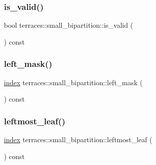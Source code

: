 \subsubsection{\texorpdfstring{is\+\_\+valid()}{is\_valid()}}
{\footnotesize\ttfamily bool terraces\+::small\+\_\+bipartition\+::is\+\_\+valid (\begin{DoxyParamCaption}{ }\end{DoxyParamCaption}) const\hspace{0.3cm}{\ttfamily [inline]}}

\mbox{\label{structterraces_1_1small__bipartition_a907f8818601439b4048d43dc4ffb8364}} 
\subsubsection{\texorpdfstring{left\+\_\+mask()}{left\_mask()}}
{\footnotesize\ttfamily \hyperlink{namespaceterraces_adbc33ccb543d1634e96d0eb02e472c77}{index} terraces\+::small\+\_\+bipartition\+::left\+\_\+mask (\begin{DoxyParamCaption}{ }\end{DoxyParamCaption}) const\hspace{0.3cm}{\ttfamily [inline]}}

\mbox{\label{structterraces_1_1small__bipartition_ac898947c97bac91255e22be00a5f3e45}} 
\subsubsection{\texorpdfstring{leftmost\+\_\+leaf()}{leftmost\_leaf()}}
{\footnotesize\ttfamily \hyperlink{namespaceterraces_adbc33ccb543d1634e96d0eb02e472c77}{index} terraces\+::small\+\_\+bipartition\+::leftmost\+\_\+leaf (\begin{DoxyParamCaption}{ }\end{DoxyParamCaption}) const\hspace{0.3cm}{\ttfamily [inline]}}

